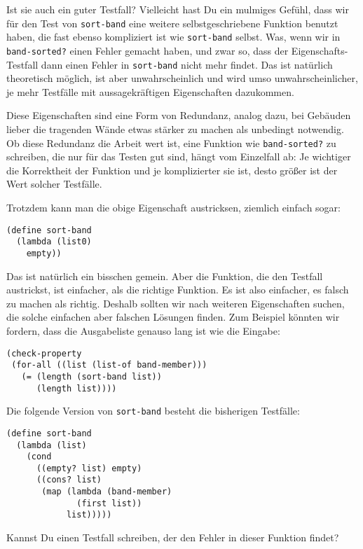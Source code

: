 Ist sie auch ein guter Testfall?  Vielleicht hast Du ein mulmiges
Gefühl, dass wir für den Test von \lstinline{sort-band} eine weitere
selbstgeschriebene Funktion benutzt haben, die fast ebenso kompliziert
ist wie \lstinline{sort-band} selbst.  Was, wenn wir in
\lstinline{band-sorted?} einen Fehler gemacht haben, und zwar so,
dass der Eigenschafts-Testfall dann einen Fehler in
\lstinline{sort-band} nicht mehr findet.  Das ist natürlich
theoretisch möglich, ist aber unwahrscheinlich und wird umso
unwahrscheinlicher, je mehr Testfälle mit aussagekräftigen
Eigenschaften dazukommen.

Diese Eigenschaften sind eine Form von Redundanz,
analog dazu, bei Gebäuden lieber die tragenden Wände etwas stärker zu
machen als unbedingt notwendig.  Ob diese Redundanz die Arbeit wert
ist, eine Funktion wie \lstinline{band-sorted?} zu schreiben, die nur
für das Testen gut sind, hängt vom Einzelfall ab: Je wichtiger die
Korrektheit der Funktion und je komplizierter sie ist, desto größer
ist der Wert solcher Testfälle.

Trotzdem kann man die obige Eigenschaft austricksen, ziemlich einfach
sogar:
%
\begin{lstlisting}
(define sort-band
  (lambda (list0)
    empty))
\end{lstlisting}
%
Das ist natürlich ein bisschen gemein.  Aber die Funktion, die den
Testfall austrickst, ist einfacher, als die richtige Funktion.  Es ist
also einfacher, es falsch zu machen als richtig.  Deshalb sollten wir
nach weiteren Eigenschaften suchen, die solche einfachen aber falschen
Lösungen finden.  Zum Beispiel könnten wir fordern, dass die
Ausgabeliste genauso lang ist wie die Eingabe:
%
\begin{lstlisting}
(check-property
 (for-all ((list (list-of band-member)))
   (= (length (sort-band list))
      (length list))))
\end{lstlisting}
%
\begin{aufgabeinline}
  Die folgende Version von \lstinline{sort-band} besteht die
  bisherigen Testfälle:
\begin{lstlisting}
(define sort-band
  (lambda (list)
    (cond
      ((empty? list) empty)
      ((cons? list)
       (map (lambda (band-member)
              (first list))
            list)))))
\end{lstlisting}
  Kannst Du einen Testfall schreiben, der den Fehler in dieser
  Funktion findet?
\end{aufgabeinline}

